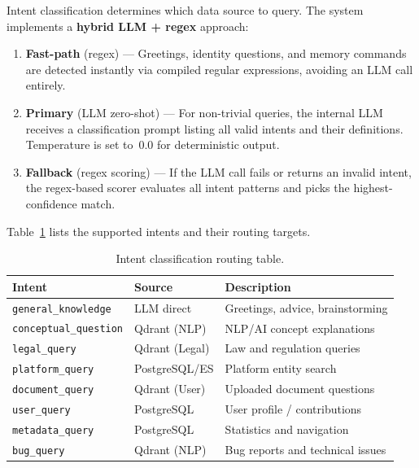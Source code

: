 \documentclass[12pt, a4paper]{article}
\begin{document}
Intent classification determines which data source to query. The system
implements a \textbf{hybrid LLM + regex} approach:

\begin{enumerate}[leftmargin=2em]
  \item \textbf{Fast-path} (regex) --- Greetings, identity questions, and
        memory commands are detected instantly via compiled regular
        expressions, avoiding an LLM call entirely.
  \item \textbf{Primary} (LLM zero-shot) --- For non-trivial queries, the
        internal LLM receives a classification prompt listing all valid
        intents and their definitions. Temperature is set to~0.0 for
        deterministic output.
  \item \textbf{Fallback} (regex scoring) --- If the LLM call fails or
        returns an invalid intent, the regex-based scorer evaluates all
        intent patterns and picks the highest-confidence match.
\end{enumerate}

Table~\ref{tab:intents} lists the supported intents and their routing targets.

\begin{table}[H]
\centering
\caption{Intent classification routing table.}
\label{tab:intents}
\small
\begin{tabularx}{\textwidth}{l l X}
\toprule
\rowcolor{tablehead}\color{white}\textbf{Intent} & \color{white}\textbf{Source} & \color{white}\textbf{Description} \\
\midrule
\texttt{general\_knowledge} & LLM direct & Greetings, advice, brainstorming \\
\rowcolor{lightgray}
\texttt{conceptual\_question} & Qdrant (NLP) & NLP/AI concept explanations \\
\texttt{legal\_query} & Qdrant (Legal) & Law and regulation queries \\
\rowcolor{lightgray}
\texttt{platform\_query} & PostgreSQL/ES & Platform entity search \\
\texttt{document\_query} & Qdrant (User) & Uploaded document questions \\
\rowcolor{lightgray}
\texttt{user\_query} & PostgreSQL & User profile / contributions \\
\texttt{metadata\_query} & PostgreSQL & Statistics and navigation \\
\rowcolor{lightgray}
\texttt{bug\_query} & Qdrant (NLP) & Bug reports and technical issues \\
\bottomrule
\end{tabularx}
\end{table}
\end{document}
